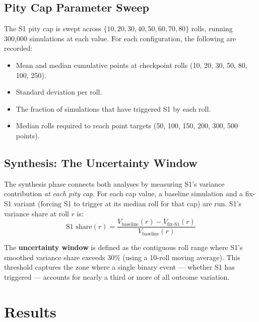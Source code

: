 \documentclass[11pt, a4paper]{article}
\begin{document}
\subsection{Pity Cap Parameter Sweep}
\label{sec:method-sweep}

The S1 pity cap is swept across
$\{10, 20, 30, 40, 50, 60, 70, 80\}$ rolls, running 300{,}000
simulations at each value. For each configuration, the following are
recorded:

\begin{itemize}[nosep]
    \item Mean and median cumulative points at checkpoint rolls
          (10, 20, 30, 50, 80, 100, 250).
    \item Standard deviation per roll.
    \item The fraction of simulations that have triggered S1 by each
          roll.
    \item Median rolls required to reach point targets
          (50, 100, 150, 200, 300, 500 points).
\end{itemize}

\subsection{Synthesis: The Uncertainty Window}
\label{sec:method-synthesis}

The synthesis phase connects both analyses by measuring S1's variance
contribution \emph{at each pity cap}. For each cap value, a baseline
simulation and a fix-S1 variant (forcing S1 to trigger at its median
roll for that cap) are run. S1's variance share at roll $r$ is:
\begin{equation}
    \text{S1 share}(r) = \frac{V_{\text{baseline}}(r) - V_{\text{fix-S1}}(r)}{V_{\text{baseline}}(r)}
\end{equation}

The \textbf{uncertainty window} is defined as the contiguous roll
range where S1's smoothed variance share exceeds 30\% (using a
10-roll moving average). This threshold captures the zone where a
single binary event --- whether S1 has triggered --- accounts for
nearly a third or more of all outcome variation.


\section{Results}
\label{sec:results}
\end{document}
